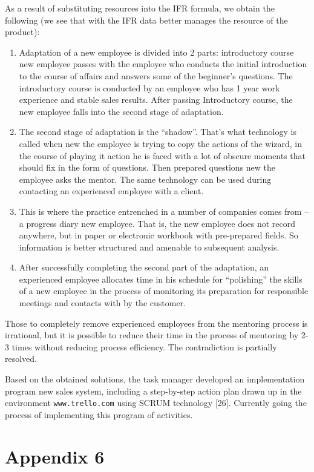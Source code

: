 \documentclass[11pt,a4paper]{book}
\begin{document}
As a result of substituting resources into the IFR formula, we obtain the
following (we see that with the IFR data better manages the resource of the
product):
\begin{enumerate}
\item Adaptation of a new employee is divided into 2 parts: introductory
  course new employee passes with the employee who conducts the initial
  introduction to the course of affairs and answers some of the beginner's
  questions. The introductory course is conducted by an employee who has 1
  year work experience and stable sales results. After passing Introductory
  course, the new employee falls into the second stage of adaptation.
\item The second stage of adaptation is the “shadow”. That's what technology
  is called when new the employee is trying to copy the actions of the wizard,
  in the course of playing it action he is faced with a lot of obscure moments
  that should fix in the form of questions. Then prepared questions new the
  employee asks the mentor. The same technology can be used during contacting
  an experienced employee with a client.
\item This is where the practice entrenched in a number of companies comes
  from -- a progress diary new employee. That is, the new employee does not
  record anywhere, but in paper or electronic workbook with pre-prepared
  fields. So information is better structured and amenable to subsequent
  analysis.
\item After successfully completing the second part of the adaptation, an
  experienced employee allocates time in his schedule for “polishing” the
  skills of a new employee in the process of monitoring its preparation for
  responsible meetings and contacts with by the customer.
\end{enumerate}
Those to completely remove experienced employees from the mentoring process is
irrational, but it is possible to reduce their time in the process of
mentoring by 2-3 times without reducing process efficiency. The contradiction
is partially resolved.

Based on the obtained solutions, the task manager developed an implementation
program new sales system, including a step-by-step action plan drawn up in the
environment \texttt{www.trello.com} using SCRUM technology [26]. Currently
going the process of implementing this program of activities.

\chapter{Appendix 6}
\end{document}
